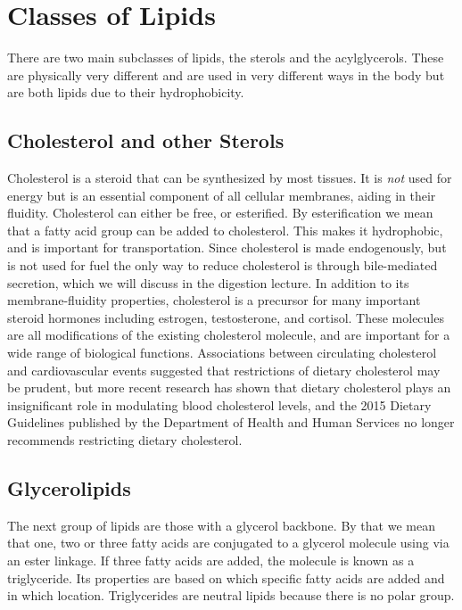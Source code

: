 \documentclass{tufte-handout}
\begin{document}
\section{Classes of Lipids}

There are two main subclasses of lipids, the sterols and the acylglycerols.  These are physically very different and are used in very different ways in the body but are both lipids due to their hydrophobicity.

\subsection{Cholesterol and other Sterols}

Cholesterol is a steroid that can be synthesized by most tissues.  It is \emph{not} used for energy but is an essential component of all cellular membranes, aiding in their fluidity.  Cholesterol can either be free, or esterified.  By esterification we mean that a fatty acid group can be added to cholesterol.  This makes it hydrophobic, and is important for transportation.  Since cholesterol is made endogenously, but is not used for fuel the only way to reduce cholesterol is through bile-mediated secretion, which we will discuss in the digestion lecture.  In addition to its membrane-fluidity properties, cholesterol is a precursor for many important steroid hormones including estrogen, testosterone, and cortisol.  These molecules are all modifications of the existing cholesterol molecule, and are important for a wide range of biological functions.  Associations between circulating cholesterol and cardiovascular events suggested that restrictions of dietary cholesterol may be prudent, but more recent research has shown that dietary cholesterol plays an insignificant role in modulating blood cholesterol levels, and the 2015 Dietary Guidelines published by the Department of Health and Human Services no longer recommends restricting dietary cholesterol\cite{USDA2015}.

\subsection{Glycerolipids}

The next group of lipids are those with a glycerol backbone.  By that we mean that one, two or three fatty acids are conjugated to a glycerol molecule using via an ester linkage.  If three fatty acids are added, the molecule is known as a triglyceride. Its properties are based on which specific fatty acids are added and in which location.  Triglycerides are neutral lipids because there is no polar group.
\end{document}
